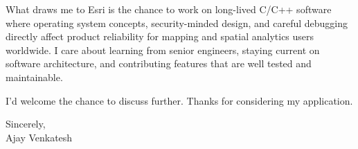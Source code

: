\documentclass[letterpaper,11pt]{article}
\begin{document}
What draws me to Esri is the chance to work on long-lived C/C++ software where operating system concepts, security-minded design, and careful debugging directly affect product reliability for mapping and spatial analytics users worldwide. I care about learning from senior engineers, staying current on software architecture, and contributing features that are well tested and maintainable.

I'd welcome the chance to discuss further. Thanks for considering my application.

\vspace{12pt}
Sincerely, \\
Ajay Venkatesh
\end{document}
